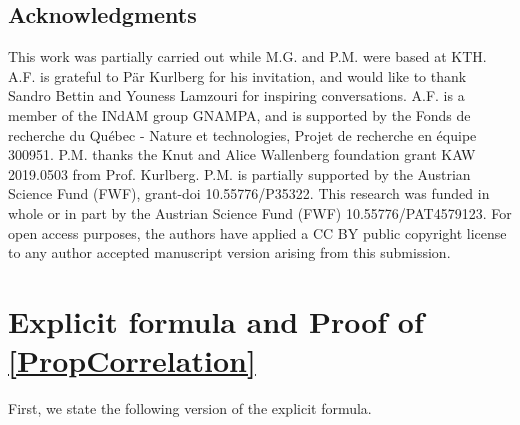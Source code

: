 \documentclass[12pt,oneside,english,a4paper]{amsart}
\theoremstyle{remark}
\numberwithin{equation}{section}
\begin{document}
\subsection*{Acknowledgments} %
This work was partially carried out while M.G. and P.M. were based at KTH. A.F. is grateful to Pär Kurlberg for his invitation, and would like to thank Sandro Bettin and Youness Lamzouri for inspiring conversations.
A.F. is a member of the INdAM group GNAMPA, and is supported by the Fonds de recherche du Qu\'ebec - Nature et technologies, Projet de recherche en \'equipe 300951.
P.M. thanks the Knut and Alice Wallenberg foundation grant KAW 2019.0503 from Prof. Kurlberg. P.M. is partially supported by the Austrian Science Fund (FWF),  grant-doi 10.55776/P35322.
This research was funded in whole or in part by the Austrian Science Fund (FWF) 10.55776/PAT4579123. For open access purposes, the authors have applied a CC BY public copyright license to any author accepted manuscript version arising from this submission.
\normalsize











\section{Explicit formula and Proof of \texorpdfstring{\cref{PropCorrelation}}{PropCorrelation}}\label{SectionCorrelation}

First, we state the following version of the explicit formula.
\end{document}
